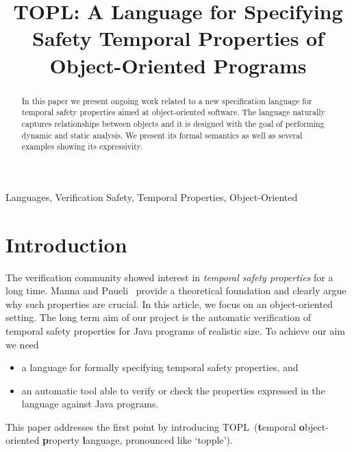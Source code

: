 \documentclass[preprint]{sigplanconf} %
\title{TOPL: A Language for Specifying Safety Temporal Properties of Object-Oriented Programs}
\newcommand{\TPL}{TOPL}
\theoremstyle{definition}
\theoremstyle{remark}
\begin{document}
\maketitle

\begin{abstract} %
In this paper we present ongoing work related to a new specification language for temporal safety properties aimed at object-oriented software.
The language naturally captures relationships between objects and it is designed with the goal of performing dynamic and static analysis.
We present its formal semantics as well as several examples showing its expressivity.
\end{abstract}
\terms Languages, Verification
\keywords Safety, Temporal Properties, Object-Oriented

\section{Introduction} %

The verification community showed interest in \emph{temporal safety properties} for a long time.
Manna and Pnueli~\cite{dblp:books/daglib/0080029} provide a theoretical foundation and clearly argue why such properties are crucial.
In this article, we focus on an object-oriented setting.
The long term aim of our project is the automatic verification of temporal safety properties for Java programs of realistic size.
To achieve our aim we need
\begin{itemize}
\item a language for formally specifying temporal safety properties, and
\item an automatic tool able to verify or check the properties expressed in the language against Java programs.
\end{itemize}
This paper addresses the first point by introducing \TPL\ (\textbf{t}emporal \textbf{o}bject-oriented \textbf{p}roperty \textbf{l}anguage, pronounced like `topple').
\end{document}
